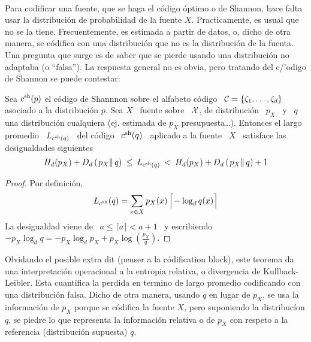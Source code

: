 \

Para codificar una  fuente, que se haga el c\'odigo \'optimo  o de Shannon, hace
falta usar la distribuci\'on de probabilidad de la fuente $X$. Practicamente, es
usual que  no se  la tiene. Frecuentemente,  es estimada  a partir de  datos, o,
dicho  de  otra manera,  se  c\'odifica  con una  distribuci\'on  que  no es  la
distribuci\'on de  la fuenta. Una pregunta que  surge es de saber  que se pierde
usando una distribuci\'on no adaptaba  (o ``falsa''). La respuesta general no es
obvia, pero tratando del c/'odigo de Shannon se puede contestar:


\begin{teorema}
  Sea $c^{\mathrm{sh}}(p)$ el  c\'odigo de Shannnon sobre el alfabeto c\'odigo  \ $\mathcal{C} = \{
  \zeta_1 ,  \ldots , \zeta_d \}$ asociado  a la distribuci\'on $p$.   Sea $X$ \
  fuente sobre  \ $\mathcal{X}$, de distribuci\'on \  $p_X$ \ y \  $q$ una distribuci\'on
  cualquiera  (ej.  estimada  de  $p_X$ presupuesta\ldots).   Entonces el  largo
  promedio \ $L_{c^{\mathrm{sh}}(q)}$ \ del c\'odigo \ $c^{\mathrm{sh}}(q)$ \ aplicado a la fuente \
  $X$ \ satisface las desigualdades siguientes
  \[
  H_d(p_X) + D_d\left( \left. p_X \right\| q  \right) \: \le \: L_{c^{\mathrm{sh}}(q)} \: < \:
  H_d(p_X) + D_d\left( \left. p_X \right\| q \right) + 1
  \]
\end{teorema}
%
\begin{proof}
  Por definici\'on,
  \[
  L_{c^{\mathrm{sh}}}(q) = \sum_{x \in X} p_X(x) \, \Big\lceil\! -\log_d q(x) \Big\rceil
  \]
  La desigualdad viene de  \ $a \le \lceil a \rceil < a +  1$ \ y escribiendo $-
  p_X \log_d q = - p_X \log_d p_X + p_X \log \left( \frac{p_X}{q} \right)$.
\end{proof}
%
Olvidando el posible extra dit  (penser a la c\'odification block), este teorema
da una  interpretaci\'on operacional  a la entropia  relativa, o  divergencia de
Kullback-Leibler.   Esta cuantifica  la  perdida en  termino  de largo  promedio
codificando con  una distribuci\'on falsa. Dicho  de otra manera,  usando $q$ en
lugar de $p_X$, se usa la  informaci\'on de $p_X$ porque se c\'odifica la fuente
$X$,  pero suponiendo  la distribuc\'ion  $q$, se  piedre lo  que  representa la
informaci\'on relativa  o de $p_X$  con respeto a la  referencia (distribuci\'on
supuesta) $q$.

\


